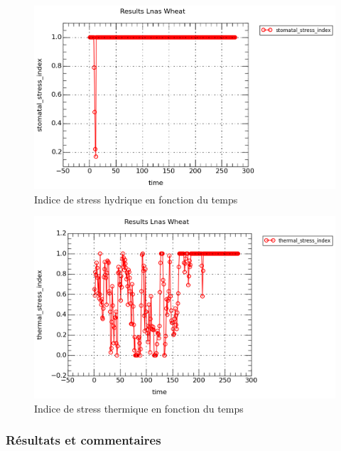 \begin{figure}[H]

\begin{center}
 \includegraphics[scale = 0.63]{./img/waterStress.png}
 \caption{Indice de stress hydrique en fonction du temps}
 \label{fig:resultatStressH}
\end{center}

\end{figure}

\begin{figure}[H]

\begin{center}
 \includegraphics[scale = 0.63]{./img/thermicStress.png}
 \caption{Indice de stress thermique en fonction du temps}
 \label{fig:resultatStressT}
\end{center}

\end{figure}

\subsubsection{Résultats et commentaires}

